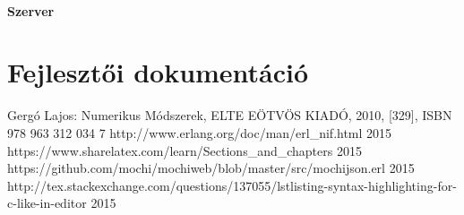 \documentclass{elteikthesis}
\begin{document}
\subsubsection{Szerver}

\chapter{Fejlesztői dokumentáció}


\begin{thebibliography}{9}
Gergó Lajos: Numerikus Módszerek, ELTE EÖTVÖS KIADÓ, 2010, [329], ISBN 978 963 312 034 7
\bibitem{} {http://www.erlang.org/doc/man/erl\_nif.html} 2015
\bibitem{} {https://www.sharelatex.com/learn/Sections\_and\_chapters} 
2015
\bibitem{} {https://github.com/mochi/mochiweb/blob/master/src/mochijson.erl} 2015
\bibitem{} {http://tex.stackexchange.com/questions/137055/lstlisting-syntax-highlighting-for-c-like-in-editor} 2015
\end{thebibliography}
\end{document}
